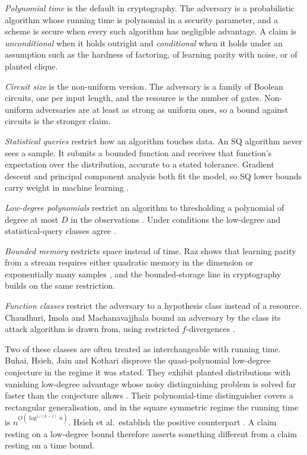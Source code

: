 \emph{Polynomial time} is the default in cryptography. The adversary is a
probabilistic algorithm whose running time is polynomial in a security
parameter, and a scheme is secure when every such algorithm has negligible
advantage. A claim is \emph{unconditional} when it holds outright and
\emph{conditional} when it holds under an assumption such as the hardness of
factoring, of learning parity with noise, or of planted clique.

\emph{Circuit size} is the non-uniform version. The adversary is a family of
Boolean circuits, one per input length, and the resource is the number of gates.
Non-uniform adversaries are at least as strong as uniform ones, so a bound
against circuits is the stronger claim.

\emph{Statistical queries} restrict how an algorithm touches data. An SQ
algorithm never sees a sample. It submits a bounded function and receives that
function's expectation over the distribution, accurate to a stated tolerance.
Gradient descent and principal component analysis both fit the model, so SQ
lower bounds carry weight in machine learning \cite{FGRVX17}.

\emph{Low-degree polynomials} restrict an algorithm to thresholding a polynomial
of degree at most $D$ in the observations \cite{Wei25}. Under conditions the
low-degree and statistical-query classes agree \cite{BBHLS21}.

\emph{Bounded memory} restricts space instead of time. Raz shows that learning
parity from a stream requires either quadratic memory in the dimension or
exponentially many samples \cite{Raz16}, and the bounded-storage line in
cryptography builds on the same restriction.

\emph{Function classes} restrict the adversary to a hypothesis class instead of
a resource. Chaudhuri, Imola and Machanavajjhala bound an adversary by the class
its attack algorithm is drawn from, using restricted $f$-divergences
\cite{CIM19}.

Two of these classes are often treated as interchangeable with running time.
Buhai, Hsieh, Jain and Kothari disprove the quasi-polynomial low-degree
conjecture in the regime it was stated. They exhibit planted distributions with
vanishing low-degree advantage whose noisy distinguishing problem is solved far
faster than the conjecture allows \cite{BHJK25}. Their polynomial-time
distinguisher covers a rectangular generalisation, and in the square symmetric
regime the running time is $n^{O(\log^{1/(k-1)} n)}$. Hsieh et al.\ establish
the positive counterpart \cite{HKKLMT26}. A claim resting on a low-degree bound
therefore asserts something different from a claim resting on a time bound.

